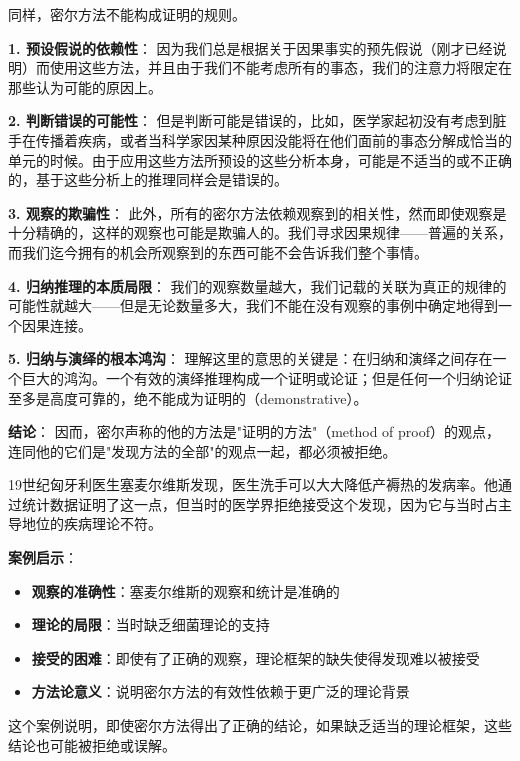 \begin{theorembox}[title=密尔方法作为证明方法的根本缺陷]
同样，密尔方法不能构成证明的规则。

\textbf{1. 预设假说的依赖性}：
因为我们总是根据关于因果事实的预先假说（刚才已经说明）而使用这些方法，并且由于我们不能考虑所有的事态，我们的注意力将限定在那些认为可能的原因上。

\textbf{2. 判断错误的可能性}：
但是判断可能是错误的，比如，医学家起初没有考虑到脏手在传播着疾病，或者当科学家因某种原因没能将在他们面前的事态分解成恰当的单元的时候。由于应用这些方法所预设的这些分析本身，可能是不适当的或不正确的，基于这些分析上的推理同样会是错误的。

\textbf{3. 观察的欺骗性}：
此外，所有的密尔方法依赖观察到的相关性，然而即使观察是十分精确的，这样的观察也可能是欺骗人的。我们寻求因果规律——普遍的关系，而我们迄今拥有的机会所观察到的东西可能不会告诉我们整个事情。

\textbf{4. 归纳推理的本质局限}：
我们的观察数量越大，我们记载的关联为真正的规律的可能性就越大——但是无论数量多大，我们不能在没有观察的事例中确定地得到一个因果连接。

\textbf{5. 归纳与演绎的根本鸿沟}：
理解这里的意思的关键是：在归纳和演绎之间存在一个巨大的鸿沟。一个有效的演绎推理构成一个证明或论证；但是任何一个归纳论证至多是高度可靠的，绝不能成为证明的（demonstrative）。

\textbf{结论}：
因而，密尔声称的他的方法是"证明的方法"（method of proof）的观点，连同他的它们是"发现方法的全部"的观点一起，都必须被拒绝。
\end{theorembox}

\begin{examplebox}[title=医学史中的认识局限：塞麦尔维斯的悲剧]
19世纪匈牙利医生塞麦尔维斯发现，医生洗手可以大大降低产褥热的发病率。他通过统计数据证明了这一点，但当时的医学界拒绝接受这个发现，因为它与当时占主导地位的疾病理论不符。

\textbf{案例启示}：
\begin{itemize}
\item \textbf{观察的准确性}：塞麦尔维斯的观察和统计是准确的
\item \textbf{理论的局限}：当时缺乏细菌理论的支持
\item \textbf{接受的困难}：即使有了正确的观察，理论框架的缺失使得发现难以被接受
\item \textbf{方法论意义}：说明密尔方法的有效性依赖于更广泛的理论背景
\end{itemize}

这个案例说明，即使密尔方法得出了正确的结论，如果缺乏适当的理论框架，这些结论也可能被拒绝或误解。
\end{examplebox}

